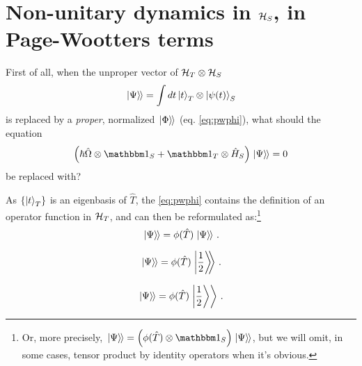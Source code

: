 \section{Non-unitary dynamics in $\mathcal{H}_S$, in Page-Wootters terms}

First of all,
when the unproper vector of $\mathcal{H}_T \otimes \mathcal{H}_S$
\begin{equation}
  \left.\left| \Psi \right\rangle\hspace{-0.115em}\right\rangle = \int dt \ket{t}_{T} \otimes \ket{\psi(t)}_{S}
\end{equation}
is replaced by a \emph{proper}, normalized $\left.\left| \Phi \right\rangle\hspace{-0.115em}\right\rangle$ (eq. \ref{eq:pwphi}),
what should the equation
\begin{equation}
  \qty(\hbar\hat{\Omega} \ox \idop_S + \idop_T \ox \hat{H}_S)\dket{\Psi} = 0
\end{equation}
be replaced with?

As $\left\{\ket{t}_T\right\}$ is an eigenbasis of $\hat{T}$, the \eqref{eq:pwphi}
contains the definition of an operator function in $\mathcal{H}_T$,
and can then be reformulated as:\footnote{
  Or, more precisely, $\dket{\Psi} = \qty( \phi(\hat{T}) \ox \idop_S ) \dket{\Psi}$,
  but we will omit, in some cases,
  tensor product by identity operators
  when it's obvious.
}
\begin{equation}
  \left.\left| \Psi \right\rangle\hspace{-0.115em}\right\rangle = \phi(\hat{T})\left.\left| \Psi \right\rangle\hspace{-0.115em}\right\rangle \, \text{.}
\end{equation}

\begin{equation}
  \left.\left| \Psi \right\rangle\hspace{-0.115em}\right\rangle = \phi(\hat{T})\left.\left| \frac{1}{2} \right\rangle\hspace{-0.365em}\right\rangle \, \text{.}
\end{equation}

\begin{equation}
  \left.\left| \Psi \right\rangle\hspace{-0.115em}\right\rangle = \phi(\hat{T})\left.\left| \frac{1}{2} \right\rangle\right\rangle \, \text{.}
\end{equation}
